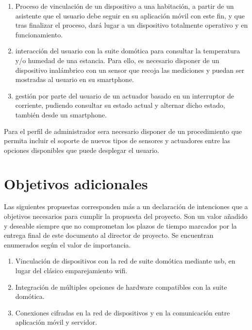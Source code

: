 \begin{enumerate}

    \item  Proceso de vinculación de un dispositivo a una habitación, a partir de un asistente que el usuario debe seguir en su aplicación móvil con este fin, y que tras finalizar el proceso, dará lugar a un dispositivo totalmente operativo y en funcionamiento.
    
    \item  interacción del usuario con la suite domótica para consultar la temperatura y/o humedad de una estancia. Para ello, es necesario disponer de un dispositivo inalámbrico con un sensor que recoja las mediciones y puedan ser mostradas al usuario en su smartphone.
    
    \item  gestión por parte del usuario de un actuador basado en un interruptor de corriente, pudiendo consultar su estado actual y alternar dicho estado, también desde un smartphone.

\end{enumerate}

Para el perfil de administrador sera necesario disponer de un procedimiento que permita incluir el soporte de nuevos tipos de sensores y actuadores entre las opciones disponibles que puede desplegar el usuario.

\section{Objetivos adicionales}
\label{ch:Capitulo3.2}

Las siguientes propuestas corresponden más a un declaración de intenciones que a objetivos necesarios para cumplir la propuesta del proyecto. Son un valor añadido y deseable siempre que no comprometan los plazos de tiempo marcados por la entrega final de este documento al director de proyecto. Se encuentran enumerados según el valor de importancia.

\begin{enumerate}

  \item Vinculación de dispositivos con la red de suite domótica mediante \gls{usb}, en lugar del clásico emparejamiento \gls{wifi}.

  \item Integración de múltiples opciones de hardware compatibles con la suite domótica.

  \item Conexiones cifradas en la red de dispositivos y en la comunicación entre aplicación móvil y servidor.

\end{enumerate}
